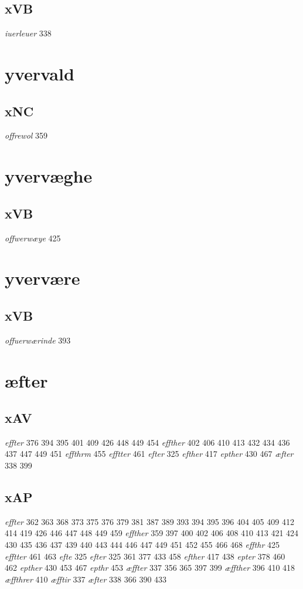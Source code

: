 \documentclass[a4paper,twocolumn]{article}
\begin{document}
\subsection{xVB}
\label{sec:org6b117c0}
\emph{iuerleuer} 338 
\section{yvervald}
\label{sec:org437e4fa}
\subsection{xNC}
\label{sec:org2c2b946}
\emph{offrewol} 359 
\section{yvervæghe}
\label{sec:orgebfe415}
\subsection{xVB}
\label{sec:orgaf99963}
\emph{offwerwæye} 425 
\section{yvervære}
\label{sec:org201f32a}
\subsection{xVB}
\label{sec:org74b7832}
\emph{offuerwærinde} 393 
\section{æfter}
\label{sec:orgcfc9783}
\subsection{xAV}
\label{sec:org6636790}
\emph{effter} 376 394 395 401 409 426 448 449 454 \emph{effther} 402 406 410 413 432 434 436 437 447 449 451 \emph{effthrm} 455 \emph{efftter} 461 \emph{efter} 325 \emph{efther} 417 \emph{epther} 430 467 \emph{æfter} 338 399 
\subsection{xAP}
\label{sec:org0ab032f}
\emph{effter} 362 363 368 373 375 376 379 381 387 389 393 394 395 396 404 405 409 412 414 419 426 446 447 448 449 459 \emph{effther} 359 397 400 402 406 408 410 413 421 424 430 435 436 437 439 440 443 444 446 447 449 451 452 455 466 468 \emph{effthr} 425 \emph{efftter} 461 463 \emph{efte} 325 \emph{efter} 325 361 377 433 458 \emph{efther} 417 438 \emph{epter} 378 460 462 \emph{epther} 430 453 467 \emph{epthr} 453 \emph{æffter} 337 356 365 397 399 \emph{æffther} 396 410 418 \emph{æffthrer} 410 \emph{æfftir} 337 \emph{æfter} 338 366 390 433 
\end{document}
